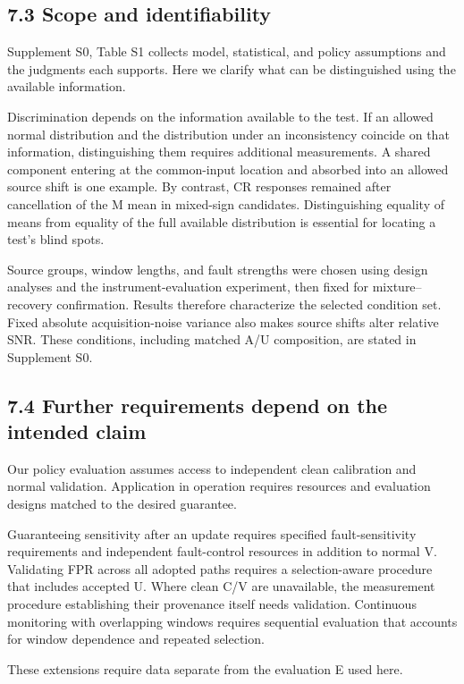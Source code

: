 \documentclass[10pt,a4paper]{article}
\begin{document}
\subsection{7.3 Scope and identifiability}

Supplement S0, Table S1 collects model, statistical, and policy assumptions and the judgments each supports. Here we clarify what can be distinguished using the available information.

Discrimination depends on the information available to the test. If an allowed normal distribution and the distribution under an inconsistency coincide on that information, distinguishing them requires additional measurements. A shared component entering at the common-input location and absorbed into an allowed source shift is one example. By contrast, CR responses remained after cancellation of the M mean in mixed-sign candidates. Distinguishing equality of means from equality of the full available distribution is essential for locating a test's blind spots.

Source groups, window lengths, and fault strengths were chosen using design analyses and the instrument-evaluation experiment, then fixed for mixture–recovery confirmation. Results therefore characterize the selected condition set. Fixed absolute acquisition-noise variance also makes source shifts alter relative SNR. These conditions, including matched A/U composition, are stated in Supplement S0.

\subsection{7.4 Further requirements depend on the intended claim}

Our policy evaluation assumes access to independent clean calibration and normal validation. Application in operation requires resources and evaluation designs matched to the desired guarantee.

Guaranteeing sensitivity after an update requires specified fault-sensitivity requirements and independent fault-control resources in addition to normal V. Validating FPR across all adopted paths requires a selection-aware procedure that includes accepted U. Where clean C/V are unavailable, the measurement procedure establishing their provenance itself needs validation. Continuous monitoring with overlapping windows requires sequential evaluation that accounts for window dependence and repeated selection.

These extensions require data separate from the evaluation E used here.
\end{document}
